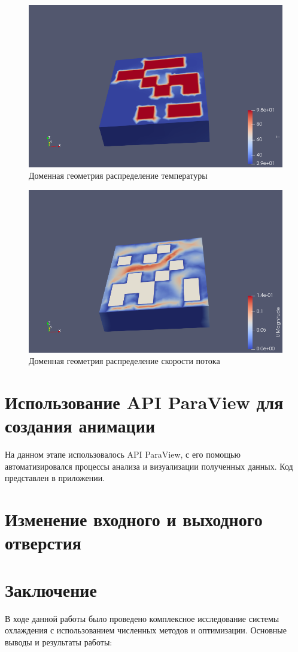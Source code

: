 \documentclass[a4paper,12pt]{extreport}
\numberwithin{equation}{chapter}
\begin{document}
\begin{figure}[h]
	\begin{center}
		\includegraphics[width=0.4\linewidth]{images/25.1.png}
		\caption{Доменная геометрия распределение температуры} %
	\end{center}
\end{figure}
\begin{figure}[h]
	\begin{center}
		\includegraphics[width=0.4\linewidth]{images/25.2.png}
		\caption{Доменная геометрия распределение скорости потока} %
	\end{center}
\end{figure}

\newpage
\section*{Использование API ParaView для создания анимации}

На данном этапе использовалось API ParaView, с его помощью автоматизировался процессы анализа и визуализации полученных данных.
Код представлен в приложении.

\newpage
\section*{Изменение входного и выходного отверстия}


\newpage
\section*{Заключение}

В ходе данной работы было проведено комплексное исследование системы охлаждения с использованием численных методов и оптимизации. Основные выводы и результаты работы:
\end{document}
